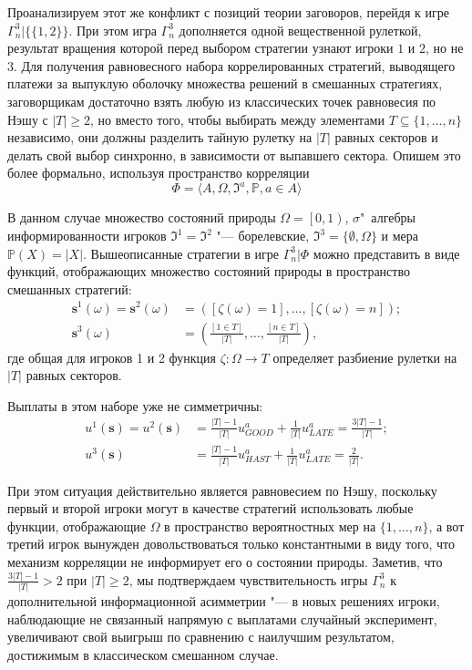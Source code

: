 Проанализируем этот же конфликт с позиций теории заговоров, перейдя к игре $\Gamma^3_n | \{\{1,2\}\}$. При этом игра $\Gamma^3_n$ дополняется одной вещественной рулеткой, результат вращения которой перед выбором стратегии узнают игроки $1$ и $2$, но не $3$. Для получения равновесного набора коррелированных стратегий, выводящего платежи за выпуклую оболочку множества решений в смешанных стратегиях, заговорщикам достаточно взять любую из классических точек равновесия по Нэшу с $\left| T \right| \ge 2$, но вместо того, чтобы выбирать между элементами $T \subseteq \{1, \ldots, n\}$ независимо, они должны разделить тайную рулетку на $\left| T \right|$ равных секторов и делать свой выбор синхронно, в зависимости от выпавшего сектора. Опишем это более формально, используя пространство корреляции
\begin{equation*}
	\Phi = \langle A, \Omega, \mathfrak{I}^a, \mathbb{P}, a \in A \rangle
\end{equation*}

В данном случае множество состояний природы $\Omega = \left[0, 1\right)$, $\sigma$"~алгебры информированности игроков $\mathfrak{I}^1 = \mathfrak{I}^2$ "--- борелевские, $\mathfrak{I}^3 = \{\emptyset, \Omega\}$ и мера $\mathbb{P}(X) = \left| X \right|$. Вышеописанные стратегии в игре $\Gamma^3_n | \Phi$ можно представить в виде функций, отображающих множество состояний природы в пространство смешанных стратегий:
\begin{align*}
	\mathbf{s}^1(\omega) = \mathbf{s}^2(\omega) &= ([\zeta(\omega) = 1], \ldots, [\zeta(\omega) = n]); \\ \mathbf{s}^3(\omega) &= \left(\frac{[1 \in T]}{\left| T \right|}, \ldots, \frac{[n \in T]}{\left| T \right|}\right),
\end{align*}
где общая для игроков 1 и 2 функция $\zeta : \Omega \rightarrow T$ определяет разбиение рулетки на $\left| T \right|$ равных секторов.

Выплаты в этом наборе уже не симметричны:
\begin{align*}
	u^1(\mathbf{s}) = u^2(\mathbf{s}) &= \frac{\left| T \right| - 1}{\left| T \right|} u^a_{GOOD} + \frac{1}{\left| T \right|} u^a_{LATE} = \frac{3 \left| T \right| - 1}{\left| T \right|};\\
	u^3(\mathbf{s}) &= \frac{\left| T \right| - 1}{\left| T \right|} u^a_{HAST} + \frac{1}{\left| T \right|} u^a_{LATE} = \frac{2}{\left| T \right|}.
\end{align*}

При этом ситуация действительно является равновесием по Нэшу, поскольку первый и второй игроки могут в качестве стратегий использовать любые функции, отображающие $\Omega$ в пространство вероятностных мер на $\{1, \ldots, n\}$, а вот третий игрок вынужден довольствоваться только константными в виду того, что механизм корреляции не информирует его о состоянии природы. Заметив, что $\frac{3 \left| T \right| - 1}{\left| T \right|} > 2$ при $\left| T \right| \ge 2$, мы подтверждаем чувствительность игры $\Gamma^3_n$ к дополнительной информационной асимметрии "--- в новых решениях игроки, наблюдающие не связанный напрямую с выплатами случайный эксперимент, увеличивают свой выигрыш по сравнению с наилучшим результатом, достижимым в классическом смешанном случае.

